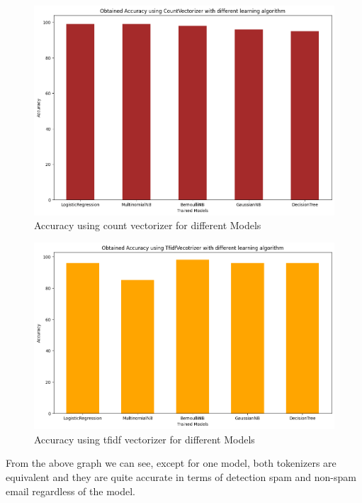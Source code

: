 \begin{figure}[H]
    \begin{center}
        \includegraphics[scale=0.4]{Graphics/chart/count_vect}
    \end{center}
    \caption{Accuracy using count vectorizer for different Models}
    \label{fig:cout_vect_acc_chart}
\end{figure}

\begin{figure}[H]
    \begin{center}
        \includegraphics[scale=0.4]{Graphics/chart/tfidf_vect}
    \end{center}
    \caption{Accuracy using tfidf vectorizer for different Models}
    \label{fig:tfidf_vect_acc_chart}
\end{figure}

From the above graph we can see, except for one model, both tokenizers are equivalent and they are quite accurate in terms of detection
spam and non-spam email regardless of the model.
